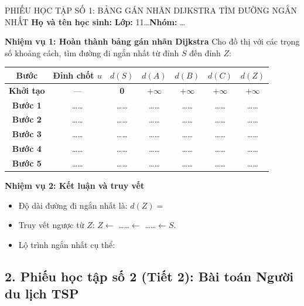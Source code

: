 \documentclass[12pt, a4paper]{article}
\begin{document}
\begin{itemize}[leftmargin=1.2cm]
\begin{pedabox}{PHIẾU HỌC TẬP SỐ 1: BẢNG GÁN NHÃN DIJKSTRA TÌM ĐƯỜNG NGẮN NHẤT}
    \textbf{Họ và tên học sinh:} \dotfill \textbf{Lớp:} 11\dots \textbf{Nhóm:} \dots
    
    \textbf{Nhiệm vụ 1: Hoàn thành bảng gán nhãn Dijkstra}
    Cho đồ thị với các trọng số khoảng cách, tìm đường đi ngắn nhất từ đỉnh $S$ đến đỉnh $Z$:
    \begin{center}
    \begin{tabular}{|c|c|c|c|c|c|c|}
    \hline
    \textbf{Bước} & \textbf{Đỉnh chốt $u$} & $d(S)$ & $d(A)$ & $d(B)$ & $d(C)$ & $d(Z)$ \\ \hline
    \textbf{Khởi tạo} & --- & \textbf{0} & $+\infty$ & $+\infty$ & $+\infty$ & $+\infty$ \\ \hline
    \textbf{Bước 1} & \dots\dots & \dots\dots & \dots\dots & \dots\dots & \dots\dots & \dots\dots \\ \hline
    \textbf{Bước 2} & \dots\dots & \dots\dots & \dots\dots & \dots\dots & \dots\dots & \dots\dots \\ \hline
    \textbf{Bước 3} & \dots\dots & \dots\dots & \dots\dots & \dots\dots & \dots\dots & \dots\dots \\ \hline
    \textbf{Bước 4} & \dots\dots & \dots\dots & \dots\dots & \dots\dots & \dots\dots & \dots\dots \\ \hline
    \textbf{Bước 5} & \dots\dots & \dots\dots & \dots\dots & \dots\dots & \dots\dots & \dots\dots \\ \hline
    \end{tabular}
    \end{center}
    
    \textbf{Nhiệm vụ 2: Kết luận và truy vết}
    \begin{itemize}[leftmargin=0.6cm]
        \item Độ dài đường đi ngắn nhất là: $d(Z) = $ \dotfill
        \item Truy vết ngược từ $Z$: $Z \leftarrow$ \dots\dots $\leftarrow$ \dots\dots $\leftarrow S$.
        \item Lộ trình ngắn nhất cụ thể: \dotfill
    \end{itemize}
\end{pedabox}

\subsection*{2. Phiếu học tập số 2 (Tiết 2): Bài toán Người du lịch TSP}


\end{itemize}
\end{document}
